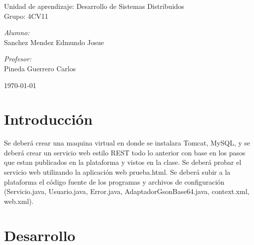 \documentclass[11pt]{article}
\begin{document}
\begin{titlepage}
\begin{center}
				{ \Large Unidad de aprendizaje: Desarrollo de Sistemas Distribuidos} \\[1cm]
				
				{ \Large Grupo: 4CV11 } \\[1cm]
				
				\noindent
				\begin{minipage}{0.5\textwidth}
					\begin{flushleft} \large
						\emph{Alumno:} \\
						Sanchez Mendez Edmundo Josue
					\end{flushleft}
				\end{minipage}%
				\begin{minipage}{0.5\textwidth}
					\begin{flushright} \large
						\emph{Profesor:} \\
						Pineda Guerrero Carlos 
					\end{flushright}
				\end{minipage}
				
				\vfill
				{\large {\today}}
			\end{center}
		\end{titlepage}
	
	\titlepage
	\tableofcontents
	\newpage
	
	\section{Introducción}
		Se deberá crear una maquina virtual en donde se instalara Tomcat, MySQL, y se deberá crear  un servicio web estilo REST todo lo anterior con base en los pasos que estan publicados en la plataforma y vistos en la clase. Se deberá probar el servicio web utilizando la aplicación web prueba.html. Se deberá subir a la plataforma el código fuente de los programas y archivos de configuración (Servicio.java, Usuario.java, Error.java, AdaptadorGsonBase64.java, context.xml, web.xml).
	\section{Desarrollo}
\end{document}
